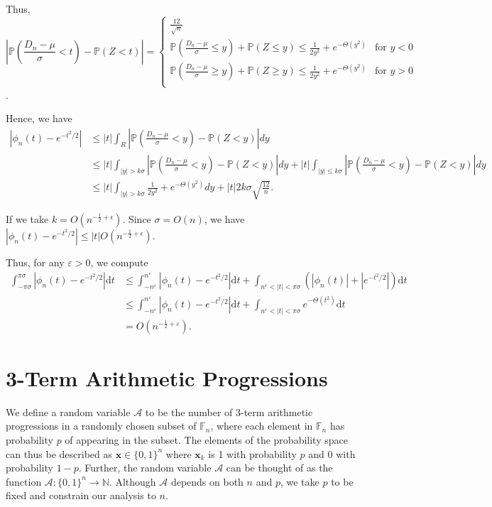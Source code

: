 \documentclass[12pt]{article} %
\newcommand{\f}[2]{\frac{#1}{#2}}
\newcommand{\abs}[1]{\left\lvert#1\right\rvert}
\renewcommand{\P}{\mathbb{P}}
\newcommand{\ap}{\mathcal{A}}
\newcommand{\F}{\mathbb{F}}
\newcommand{\bbn}{\mathbb{N}}
\newcommand{\bfx}{\mathbf{x}}
\renewcommand{\d}{\mathrm{d}}
\newcommand{\eps}{\varepsilon}
\theoremstyle{definition}
\theoremstyle{remark}
\begin{document}
Thus, \[\abs{\P(\f{D_n - \mu}{\sigma} < t) - \P(Z < t)} = \begin{cases} 
      \f{12}{\sqrt{n}} \\[10pt]
      \P(\f{D_n - \mu}{\sigma} \leq y) + \P(Z \leq y) \leq \frac{1}{2y^2} + e^{-\Theta(y^2)} & \text{for } y < 0 \\[10pt]
      \P(\f{D_n - \mu}{\sigma} \geq y) + \P(Z\geq y) \leq \frac{1}{2y^2} + e^{-\Theta(y^2)} & \text{for } y > 0 \\[10pt]
\end{cases} \].

Hence, we have
\begin{align}
\abs{\phi_n(t) - e^{-t^2/2}} &\leq \abs{t} \int_R \abs{\P(\f{D_n - \mu}{\sigma} < y) - \P(Z < y)} dy  \\
&\leq |t| \int_{|y|>k\sigma} \abs{\P(\f{D_n - \mu}{\sigma} < y) - \P(Z < y)} dy + |t| \int_{|y| \leq k\sigma}  \abs{\P(\f{D_n - \mu}{\sigma} < y) - \P(Z < y)} dy \\
&\leq |t| \int_{|y|>k\sigma} \frac{1}{2y^2} + e^{-\Theta(y^2)} dy + |t|2k\sigma \sqrt{\frac{12}{n}}.
\end{align}

If we take $k = O(n^{-\frac{1}{2} + \epsilon})$. Since $\sigma = O(n)$, we have $\abs{\phi_n(t) - e^{-t^2/2}} \leq |t|O(n^{-\frac{1}{2} + \epsilon})$.

	Thus, for any $\eps > 0$, we compute
	\begin{align*}
		\int_{-\pi \sigma}^{\pi \sigma} \abs{\phi_n(t) - e^{-t^2/2}} \d t
		&\leq \int_{-n^\eps}^{n^\eps} \abs{\phi_n(t) - e^{-t^2/2}} \d t + \int_{n^\eps < \abs{t} < \pi \sigma} (\abs{\phi_n(t)} + |e^{-t^2/2}|) \d t \\
		&\leq \int_{-n^\eps}^{n^\eps} \abs{\phi_n(t) - e^{-t^2/2}} \d t + \int_{n^\eps < \abs{t} < \pi \sigma} e^{-\Theta(t^2)} \d t \\
		&= O(n^{-\f{1}{2} + \eps}).
	\end{align*}

\section{3-Term Arithmetic Progressions}

We define a random variable $\ap$ to be the number of 3-term arithmetic progressions in a randomly chosen subset of $\F_n$, where each element in $\F_n$ has probability $p$ of appearing in the subset. The elements of the probability space can thus be described as $\bfx \in \{0,1\}^n$ where $\bfx_k$ is 1 with probability $p$ and 0 with probability $1-p$. Further, the random variable $\ap$ can be thought of as the function $\ap : \{0,1\}^n \to \bbn$. Although $\ap$ depends on both $n$ and $p$, we take $p$ to be fixed and constrain our analysis to $n$.
\end{document}
